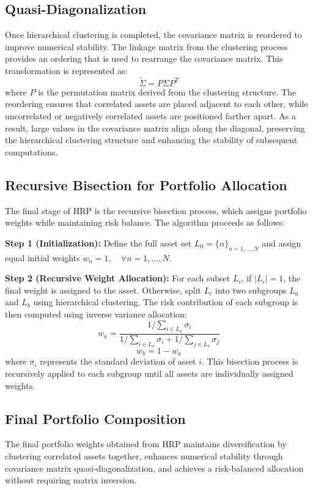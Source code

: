 \documentclass[english]{maciarticle}
\begin{document}
\subsection{Quasi-Diagonalization}

Once hierarchical clustering is completed, the covariance matrix is reordered to improve numerical stability. The linkage matrix from the clustering process provides an ordering that is used to rearrange the covariance matrix. This transformation is represented as:
\[
\tilde{\Sigma} = P \Sigma P^T
\]
where \( P \) is the permutation matrix derived from the clustering structure. The reordering ensures that correlated assets are placed adjacent to each other, while uncorrelated or negatively correlated assets are positioned farther apart. As a result, large values in the covariance matrix align along the diagonal, preserving the hierarchical clustering structure and enhancing the stability of subsequent computations.

\subsection{Recursive Bisection for Portfolio Allocation}

The final stage of HRP is the recursive bisection process, which assigns portfolio weights while maintaining risk balance. The algorithm proceeds as follows:

\textbf{Step 1 (Initialization):}
Define the full asset set \(L_0 = \{ n \}_{n=1,...,N}\) and assign equal initial weights \(w_n = 1, \quad \forall n = 1, ..., N\).

\textbf{Step 2 (Recursive Weight Allocation):}
For each subset \( L_i \), if \( |L_i| = 1 \), the final weight is assigned to the asset. Otherwise, split \( L_i \) into two subgroups \( L_a \) and \( L_b \) using hierarchical clustering. The risk contribution of each subgroup is then computed using inverse variance allocation:
\[
w_a = \frac{1 / \sum_{i \in L_a} \sigma_i}{1 / \sum_{i \in L_a} \sigma_i + 1 / \sum_{j \in L_b} \sigma_j}
\]
\[
w_b = 1 - w_a
\]
where \( \sigma_i \) represents the standard deviation of asset \( i \). This bisection process is recursively applied to each subgroup until all assets are individually assigned weights.

\subsection{Final Portfolio Composition}

The final portfolio weights obtained from HRP maintains diversification by clustering correlated assets together, enhances numerical stability through covariance matrix quasi-diagonalization, and achieves a risk-balanced allocation without requiring matrix inversion.
\end{document}
